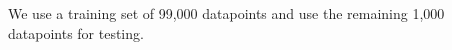 We use a training set of 99,000 datapoints and use the remaining 1,000 datapoints for testing. 
%
%
%
%
